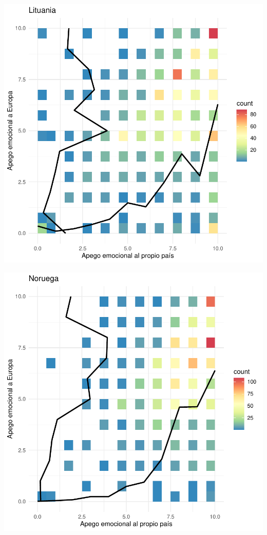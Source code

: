 \documentclass{article}
\begin{document}
\includegraphics{Informe-020}

\includegraphics{Informe-021}
\end{document}

